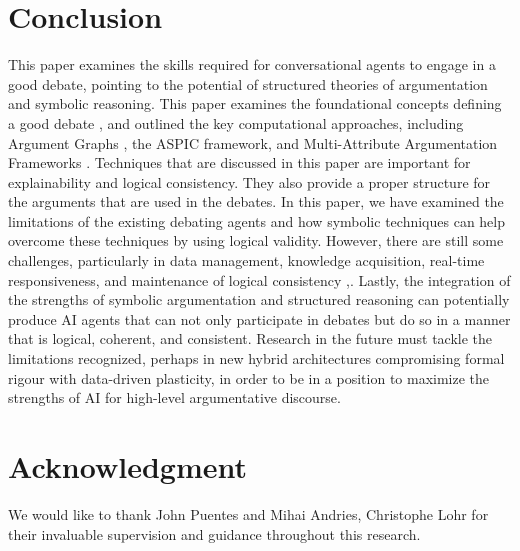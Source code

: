 \documentclass[conference]{IEEEtran}
\begin{document}
\newpage
\section{Conclusion}
This paper examines the skills required for conversational agents to engage in a good debate, pointing to the potential of structured theories of argumentation and symbolic reasoning. This paper examines the foundational concepts defining a good debate \cite{rakshit2019debbie},\cite{tan2016winning}  and outlined the key computational approaches, including Argument Graphs \cite{chalaguine2020persuasive}, the ASPIC framework, and Multi-Attribute Argumentation Frameworks \cite{engelmann2022argumentation}. 
Techniques that are discussed in this paper are important for explainability and logical consistency. They also provide a proper structure for the arguments that are used in the debates.
In this paper, we have examined the limitations of the existing debating agents and how symbolic techniques can help overcome these techniques by using logical validity.  However, there are still some challenges, particularly in data management, knowledge acquisition, real-time responsiveness, and maintenance of logical consistency \cite{ilkou2020symbolic},\cite{kasif2024trilogy}.
Lastly, the integration of the strengths of symbolic argumentation and structured reasoning can potentially produce AI agents that can not only participate in debates but do so in a manner that is logical, coherent, and consistent. Research in the future must tackle the limitations recognized, perhaps in new hybrid architectures compromising formal rigour with data-driven plasticity, in order to be in a position to maximize the strengths of AI for high-level argumentative discourse.


\section*{Acknowledgment}
We would like to thank John Puentes and Mihai Andries, Christophe Lohr for their invaluable supervision and guidance throughout this research.

\newpage
\printbibliography[notkeyword=web, title={References}]

    
\end{document}
